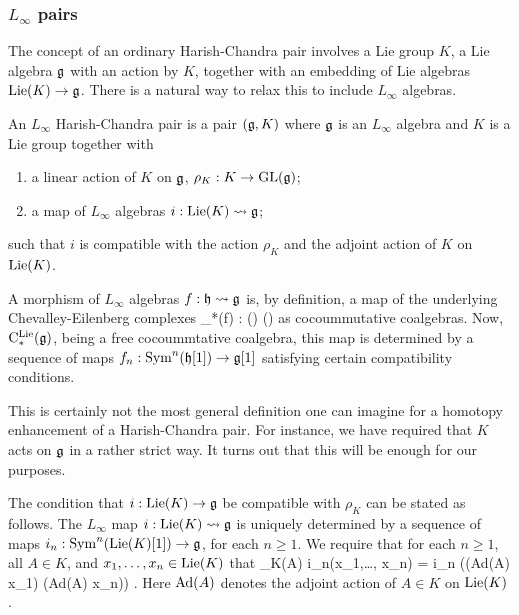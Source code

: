 \subsubsection{$L_\infty$ pairs}\label{sec: extended pair}

The concept of an ordinary Harish-Chandra pair involves a Lie group $K$, a Lie algebra $\mathfrak g$ with an action by $K$, together with an embedding of Lie algebras ${\rm Lie}(K) \to \mathfrak g$. 
There is a natural way to relax this to include $L_\infty$ algebras.

\begin{dfn} An $L_\infty$ Harish-Chandra pair is a pair $(\mathfrak g,K)$ where $\mathfrak g$ is an $L_\infty$ algebra and $K$ is a Lie group together with
\begin{enumerate}
\item a linear action of $K$ on $\mathfrak g$, $\rho_K : K \to {\rm GL}(\mathfrak g)$;
\item a map of $L_\infty$ algebras $i : {\rm Lie}(K) \rightsquigarrow \mathfrak g$;
\end{enumerate}
such that $i$ is compatible with the action $\rho_K$ and the adjoint action of $K$ on ${\rm Lie}(K)$.
\end{dfn}

\begin{rmk}
A morphism of $L_\infty$ algebras $f : \mathfrak h \rightsquigarrow \mathfrak g$ is, by definition, a map of the underlying Chevalley-Eilenberg complexes
\ben
\clieu_*(f) : \clieu(\fh) \to \clieu(\fg)
\een 
as cocoummutative coalgebras. 
Now, ${\rm C}^{\rm Lie}_*(\mathfrak g)$, being a free cocoummtative coalgebra, this map is determined by a sequence of maps $f_n : {\rm Sym}^n(\mathfrak h[1]) \to \mathfrak g[1]$ satisfying certain compatibility conditions. 
\end{rmk}

\begin{rmk} 
This is certainly not the most general definition one can imagine for a homotopy enhancement of a Harish-Chandra pair. 
For instance, we have required that $K$ acts on $\mathfrak g$ in a rather strict way. 
It turns out that this will be enough for our purposes.
\end{rmk}

The condition that $i : {\rm Lie}(K) \to \mathfrak g$ be compatible with $\rho_K$ can be stated as follows. 
The $L_\infty$ map $i : {\rm Lie}(K) \rightsquigarrow \mathfrak g$ is uniquely determined by a sequence of maps $i_n : {\rm Sym}^n({\rm Lie}(K)[1]) \to \mathfrak g$, for each $n \geq 1$. 
We require that for each $n \geq 1$, all $A \in K$, and $x_1,\ldots, x_n \in {\rm Lie}(K)$ that
\ben
\rho_K(A) \cdot i_n(x_1,\ldots, x_n) = i_n \left(\left({\rm Ad}(A) \cdot x_{1}\right) \cdots  \left({\rm Ad}(A) \cdot x_{n}\right)\right) .
\een 
Here ${\rm Ad}(A)$ denotes the adjoint action of $A \in K$ on ${\rm Lie}(K)$. 

